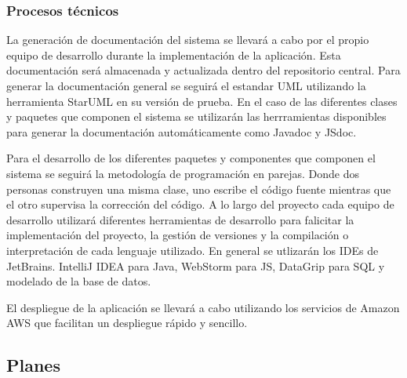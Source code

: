 \subsubsection{Procesos técnicos}

La generación de documentación del sistema se llevará a cabo por el propio equipo de desarrollo durante la implementación de la aplicación. Esta documentación será almacenada y actualizada dentro del repositorio central. Para generar la documentación general se seguirá el estandar UML utilizando la herramienta StarUML en su versión de prueba. En el caso de las diferentes clases y paquetes que componen el sistema se utilizarán las herrramientas disponibles para generar la documentación automáticamente como Javadoc y JSdoc.

Para el desarrollo de los diferentes paquetes y componentes que componen el sistema se seguirá la metodología de programación en parejas. Donde dos personas construyen una misma clase, uno escribe el código fuente mientras que el otro supervisa la corrección del código. A lo largo del proyecto cada equipo de desarrollo utilizará diferentes herramientas de desarrollo para falicitar la implementación del proyecto, la gestión de versiones y la compilación o interpretación de cada lenguaje utilizado. En general se utlizarán los IDEs de JetBrains. IntelliJ IDEA para Java, WebStorm para JS, DataGrip para SQL y modelado de la base de datos.

El despliegue de la aplicación se llevará a cabo utilizando los servicios de Amazon AWS que facilitan un despliegue rápido y sencillo.

\subsection{Planes}
\label{pl}
